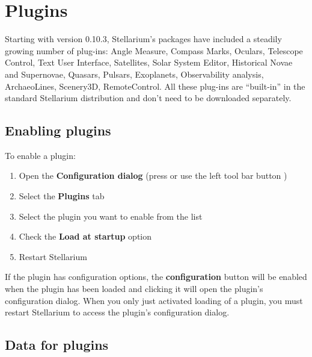 
\chapter{Plugins}
\label{ch:Plugins}

Starting with version 0.10.3, Stellarium's packages have included a steadily growing number of
plug-ins: Angle Measure, Compass Marks, Oculars, Telescope Control, Text
User Interface, Satellites, Solar System Editor, Historical Novae and 
Supernovae, Quasars, Pulsars, Exoplanets, Observability analysis, ArchaeoLines, Scenery3D, RemoteControl. All
these plug-ins are ``built-in'' in the standard Stellarium distribution
and don't need to be downloaded separately.


\section{Enabling plugins}
\label{sec:Plugins:EnablingPlugins}


To enable a plugin:

\begin{enumerate}
\item Open the \textbf{Configuration dialog} (press  or use
  the left tool bar button )
\item Select the \textbf{Plugins} tab
\item Select the plugin you want to enable from the list
\item Check the \textbf{Load at startup} option
\item Restart Stellarium
\end{enumerate}

\noindent If the plugin has configuration options, the
\textbf{configuration} button will be enabled when the plugin has been
loaded and clicking it will open the plugin's configuration
dialog. When you only just activated loading of a plugin, you must
restart Stellarium to access the plugin's configuration dialog.

\section{Data for plugins}
\label{sec:Plugins:DataForPlugins}

